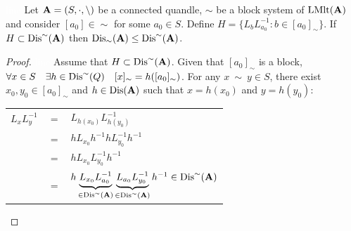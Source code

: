 \documentclass{mcom-l}
\begin{document}
\begin{lemma}\label{subsetlemma}\textcolor{white}{line}\newline
Let $\mathbf{A} = (S, \cdot, \backslash)$ be a connected quandle, $\sim$ be a block system of $\operatorname{LMlt}(\mathbf{A})$ and consider $[a_0]\in \sim$ for some $a_0\in S$. Define $H = \{L_bL_{a_0}^{-1} : b \in [a_0]_\sim\}$. If $H \subset \operatorname{Dis}^\sim(\mathbf{A})$ then $\operatorname{Dis}_\sim(\mathbf{A}) \leq \operatorname{Dis}^\sim(\mathbf{A})$.
\begin{proof}\textcolor{white}{line}\newline
Assume that $H \subset \operatorname{Dis}^\sim(\mathbf{A})$.\newline
Given that $[a_0]_\sim$ is a block, $\forall x \in S\quad \exists h\in \operatorname{Dis}^\sim(Q)\quad [x]_\sim = h([a_0]_\sim)$.\newline
For any $x~\sim~y\in S$, there exist $x_0,y_0\in [a_0]_\sim$ and $h\in \operatorname{Dis}(\mathbf{A})$ such that $x=h(x_0)$ and $y=h(y_0)$:
\begin{center}
    \begin{tabular}{ccl}
        $L_xL_y^{-1}$ & $=$ & $L_{h(x_0)}L_{h(y_0)}^{-1}$\\
         & $=$ & $hL_{x_0}h^{-1}hL_{y_0}^{-1}h^{-1}$\\
         & $=$ & $hL_{x_0}L_{y_0}^{-1}h^{-1}$\\
         & $=$ & $h\underbrace{L_{x_0}L_{a_0}^{-1}}_{\in \operatorname{Dis}^\sim(\mathbf{A})}\underbrace{L_{a_0}L_{y_0}^{-1}}_{ \in \operatorname{Dis}^\sim(\mathbf{A})}h^{-1} \in \operatorname{Dis}^\sim(\mathbf{A})$\\
    \end{tabular}
\end{center}
\end{proof}
\end{lemma}
\end{document}
